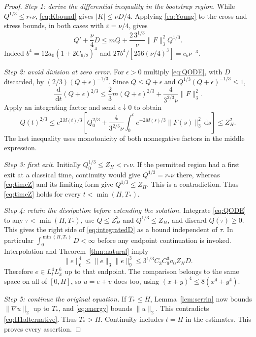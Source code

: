 \documentclass[11pt,a4paper]{article}
\theoremstyle{definition}\newtheorem{definition}[theorem]{Definition}
\theoremstyle{remark}\newtheorem{remark}[theorem]{Remark}
\newcommand{\dd}{\,\mathrm d}
\newcommand{\norm}[1]{\lVert #1\rVert}
\newcommand{\rstar}{r_*}
\numberwithin{equation}{section}
\begin{document}
\begin{proof}
\emph{Step 1: derive the differential inequality in the bootstrap region.}
While $Q^{1/3}\le\rstar\nu$, \eqref{eq:Kbound} gives $|K|\le\nu D/4$. Applying \eqref{eq:Young} to the cross and stress bounds, in both cases with $\varepsilon=\nu/4$, gives
\begin{equation}\label{eq:QODE}
 Q'+\frac\nu4D\le mQ+\frac{2\,3^{1/3}}\nu\norm F_3^2Q^{1/3}.
\end{equation}
Indeed $b^4=12a_0(1+2C_{9/2})^4$ and $27b^4/[256(\nu/4)^3]=c_b\nu^{-3}$.

\emph{Step 2: avoid division at zero error.}
For $\epsilon>0$ multiply \eqref{eq:QODE}, with $D$ discarded, by $(2/3)(Q+\epsilon)^{-1/3}$. Since $Q\le Q+\epsilon$ and $Q^{1/3}(Q+\epsilon)^{-1/3}\le1$,
\[
 \frac{\dd}{\dd t}(Q+\epsilon)^{2/3}
 \le\frac23m(Q+\epsilon)^{2/3}+\frac4{3^{2/3}\nu}\norm F_3^2.
\]
Apply an integrating factor and send $\epsilon\downarrow0$ to obtain
\begin{equation}\label{eq:timeZ}
 Q(t)^{2/3}\le e^{2M(t)/3}\left[Q_0^{2/3}
 +\frac4{3^{2/3}\nu}\int_0^t e^{-2M(s)/3}\norm{F(s)}_3^2\dd s\right]
 \le Z_H^2.
\end{equation}
The last inequality uses monotonicity of both nonnegative factors in the middle expression.

\emph{Step 3: first exit.}
Initially $Q_0^{1/3}\le Z_H<\rstar\nu$. If the permitted region had a first exit at a classical time, continuity would give $Q^{1/3}=\rstar\nu$ there, whereas \eqref{eq:timeZ} and its limiting form give $Q^{1/3}\le Z_H$. This is a contradiction. Thus \eqref{eq:timeZ} holds for every $t<\min(H,T_*)$.

\emph{Step 4: retain the dissipation before extending the solution.}
Integrate \eqref{eq:QODE} to any $\tau<\min(H,T_*)$, use $Q\le Z_H^3$ and $Q^{1/3}\le Z_H$, and discard $Q(\tau)\ge0$. This gives the right side of \eqref{eq:integratedD} as a bound independent of $\tau$. In particular $\int_0^{\min(H,T_*)}D<\infty$ before any endpoint continuation is invoked. Interpolation and Theorem~\ref{thm:natural} imply
\begin{equation}\label{eq:eSerrin}
 \norm e_6^4\le\norm e_3\norm e_9^3
 \le3^{1/3}C_3C_9^3a_0Z_H D.
\end{equation}
Therefore $e\in L^4_tL^6_x$ up to that endpoint. The comparison belongs to the same space on all of $[0,H]$, so $u=e+v$ does too, using $(x+y)^4\le8(x^4+y^4)$.

\emph{Step 5: continue the original equation.}
If $T_*\le H$, Lemma~\ref{lem:serrin} now bounds $\norm{\nabla u}_2$ up to $T_*$, and \eqref{eq:energy} bounds $\norm u_2$. This contradicts \eqref{eq:H1alternative}. Thus $T_*>H$. Continuity includes $t=H$ in the estimates. This proves every assertion.
\end{proof}
\end{document}
